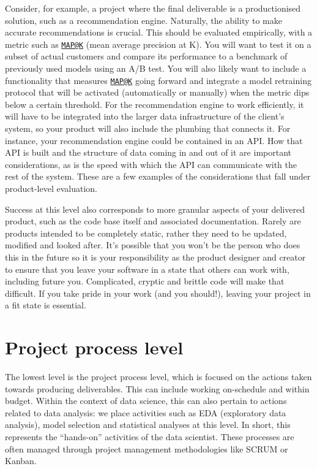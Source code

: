 \documentclass[]{book}
\begin{document}
Consider, for example, a project where the final deliverable is a
productionised solution, such as a recommendation engine. Naturally, the
ability to make accurate recommendations is crucial. This should be
evaluated empirically, with a metric such as
\href{mailto:MAP@K}{\nolinkurl{MAP@K}} (mean average precision at K).
You will want to test it on a subset of actual customers and compare its
performance to a benchmark of previously used models using an A/B test.
You will also likely want to include a functionality that measures
\href{mailto:MAP@K}{\nolinkurl{MAP@K}} going forward and integrate a
model retraining protocol that will be activated (automatically or
manually) when the metric dips below a certain threshold. For the
recommendation engine to work efficiently, it will have to be integrated
into the larger data infrastructure of the client's system, so your
product will also include the plumbing that connects it. For instance,
your recommendation engine could be contained in an API. How that API is
built and the structure of data coming in and out of it are important
considerations, as is the speed with which the API can communicate with
the rest of the system. These are a few examples of the considerations
that fall under product-level evaluation.

Success at this level also corresponds to more granular aspects of your
delivered product, such as the code base itself and associated
documentation. Rarely are products intended to be completely static,
rather they need to be updated, modified and looked after. It's possible
that you won't be the person who does this in the future so it is your
responsibility as the product designer and creator to ensure that you
leave your software in a state that others can work with, including
future you. Complicated, cryptic and brittle code will make that
difficult. If you take pride in your work (and you should!), leaving
your project in a fit state is essential.

\hypertarget{project-process-level}{%
\section{Project process level}\label{project-process-level}}

The lowest level is the project process level, which is focused on the
actions taken towards producing deliverables. This can include working
on-schedule and within budget. Within the context of data science, this
can also pertain to actions related to data analysis: we place
activities such as EDA (exploratory data analysis), model selection and
statistical analyses at this level. In short, this represents the
``hands-on'' activities of the data scientist. These processes are often
managed through project management methodologies like SCRUM or Kanban.
\end{document}

